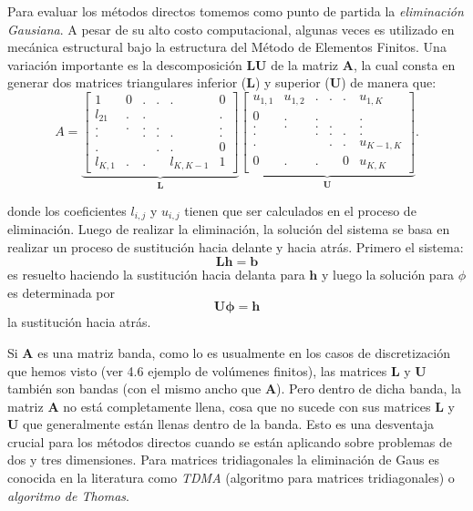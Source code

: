 \documentclass[a4paper,10pt, oneside]{book}
\begin{document}
Para evaluar los métodos directos tomemos como punto de partida la \textit{eliminación Gausiana}. A pesar de su alto costo computacional, algunas veces es utilizado en mecánica estructural bajo la estructura del Método de Elementos Finitos. Una variación importante es la descomposición $\mathbf{LU}$ de la matriz $\mathbf{A}$, la cual consta en generar dos matrices triangulares inferior ($\mathbf{L}$) y superior ($\mathbf{U}$) de manera que:
\begin{equation}
	A = 
	\underbrace{	
	\begin{bmatrix}
		1 		& 0 & . & . & . & 0 \\
		l_{21} 	& . & . & ~ & ~ & . \\
		. 	& . & . & . & ~ & . \\
		. 	& ~ & . & . & . & . \\
		. 	& ~ & ~ & . & . & 0 \\
		l_{K,1} 	& . & . & ~ & l_{K,K-1} & 1 
	\end{bmatrix}}_{\mathbf{L}}
	\underbrace{
	\begin{bmatrix}
		u_{1,1} 	& u_{1,2} & . & . & . & u_{1,K} \\
		0 & . & . & ~ & ~ & . \\
		. 	& . & . & . & ~ & . \\
		. 	& ~ & . & . & . & . \\
		. 	& ~ & ~ & . & . & u_{K-1,K} \\
		0 	& . & . & ~ & 0 & u_{K,K} 
	\end{bmatrix}}_{\mathbf{U}}. \nonumber
\end{equation}

donde los coeficientes $l_{i,j}$ y $u_{i,j}$ tienen que ser calculados en el proceso de eliminación. Luego de realizar la eliminación, la solución del sistema se basa en realizar un proceso de sustitución hacia delante y hacia atrás. Primero el sistema:
\begin{equation}
	\mathbf{Lh = b} \nonumber
\end{equation}
es resuelto haciendo la sustitución hacia delanta para $\mathbf{h}$ y luego la solución para $\phi$ es determinada por
\begin{equation}
	\mathbf{U \phi = h} \nonumber
\end{equation}
la sustitución hacia atrás.

Si $\mathbf{A}$ es una matriz banda, como lo es usualmente en los casos de discretización que hemos visto (ver 4.6 ejemplo de volúmenes finitos), las matrices $\mathbf{L}$ y $\mathbf{U}$ también son bandas (con el mismo ancho que $\mathbf{A}$). Pero dentro de dicha banda, la matriz $\mathbf{A}$ no está completamente llena, cosa que no sucede con sus matrices $\mathbf{L}$ y $\mathbf{U}$ que generalmente están llenas dentro de la banda. Esto es una desventaja crucial para los métodos directos cuando se están aplicando sobre problemas de dos y tres dimensiones. Para matrices tridiagonales la eliminación de Gaus es conocida en la literatura como \textit{TDMA} (algoritmo para matrices tridiagonales) o \textit{algoritmo de Thomas}.
\end{document}
